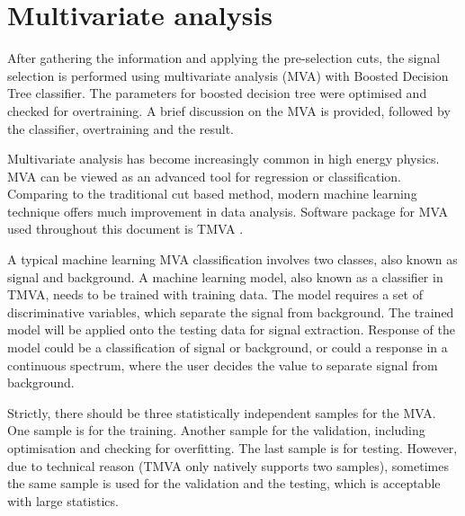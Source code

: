 \section{Multivariate analysis}
\label{sec:doubleHiggsMVA}
After gathering the information and applying the pre-selection cuts, the signal selection is performed using  multivariate analysis (MVA) with Boosted Decision Tree classifier. The parameters for boosted decision tree were optimised and checked for overtraining. A brief discussion on the MVA is provided, followed by the classifier, overtraining and the result.

Multivariate analysis  has become increasingly common in high energy physics. MVA can be viewed as an advanced tool for regression or classification. Comparing to the traditional cut based method, modern machine learning technique offers much improvement in data analysis. Software package for MVA used throughout this document is TMVA \cite{Hocker:2007ht}.

A typical machine learning MVA classification involves two classes, also known as signal and background. A machine learning model, also known as a classifier in TMVA, needs to be trained with training data. The model requires a set of discriminative variables, which separate the signal from background. The trained model will be applied onto the testing data for signal extraction. Response of the model could be a classification of signal or background, or could  a response in a continuous spectrum, where the user decides the value to separate signal from background.

Strictly, there should be three statistically independent samples for the MVA. One sample is for the training. Another sample for the validation, including optimisation and checking for overfitting. The last sample is for testing. However, due to technical reason (TMVA only natively supports two samples), sometimes the same sample is used for the validation and the testing, which is acceptable with large statistics.

